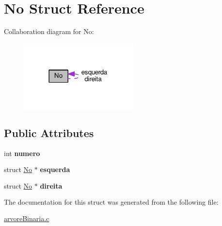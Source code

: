 \hypertarget{structNo}{}\section{No Struct Reference}
\label{structNo}


Collaboration diagram for No\+:\nopagebreak
\begin{figure}[H]
\begin{center}
\leavevmode
\includegraphics[width=170pt]{structNo__coll__graph}
\end{center}
\end{figure}
\subsection*{Public Attributes}
\begin{DoxyCompactItemize}
\item 
int {\bfseries numero}\hypertarget{structNo_a17d01dcbc2c4634eed615362d82f4c62}{}\label{structNo_a17d01dcbc2c4634eed615362d82f4c62}

\item 
struct \hyperlink{structNo}{No} $\ast$ {\bfseries esquerda}\hypertarget{structNo_a46df4feb1f3d1ec847ff8a68c99c4df5}{}\label{structNo_a46df4feb1f3d1ec847ff8a68c99c4df5}

\item 
struct \hyperlink{structNo}{No} $\ast$ {\bfseries direita}\hypertarget{structNo_a657cba57b414c39e8ad3e39521215563}{}\label{structNo_a657cba57b414c39e8ad3e39521215563}

\end{DoxyCompactItemize}


The documentation for this struct was generated from the following file\+:\begin{DoxyCompactItemize}
\item 
\hyperlink{arvoreBinaria_8c}{arvore\+Binaria.\+c}\end{DoxyCompactItemize}
